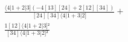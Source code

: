 \documentclass[varwidth, border=5pt]{standalone}
\begin{document}
\begin{my}
$\begin{gathered}
\scriptscriptstyle\frac{⟨4|1+2|3](-4[13][24]+2[12][34])}{[24][34]⟨4|1+3|2]} +\\
\scriptscriptstyle\frac{1[12]⟨4|1+2|3]²}{[34]⟨4|1+3|2]²} \phantom{+}
\end{gathered}$
\end{my}
\end{document}
